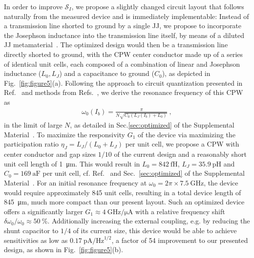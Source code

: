 In order to improve $\mathcal{S}_I$, we propose a slightly changed circuit layout that follows naturally from the measured device and is immediately implementable:
% 
Instead of a transmission line shorted to ground by a single JJ, we propose to incorporate the Josephson inductance into the transmission line itself, by means of a diluted JJ metamaterial~\cite{planatUnderstandingSaturationPower2019}.
% 
The optimized design would then be a transmission line directly shorted to ground, with the CPW center conductor made up of a series of identical unit cells, each composed of a combination of linear and Josephson inductance ($L_0,L_J$) and a capacitance to ground ($C_0$), as depicted in Fig.~\ref{fig:figure5}(a).
% 
Following the approach to circuit quantization presented in Ref.~\cite{gelyQuCATQuantumCircuit2019} and methods from Refs.~\cite{noscheseTridiagonalToeplitzMatrices2013,niggBlackBoxSuperconductingCircuit2012,vool_introductionquantum_2017}, we derive the resonance frequency of this CPW as
% 
\begin{align}
\omega_0(I_b)=\frac{\pi}{N\sqrt{C_0(L_J(I_b)+L_0)}} \ ,
\end{align}
% 
in the limit of large $N$, as detailed in Sec.\ref{sec:optimized} of the Supplemental Material~\cite{SeeSupplementalMaterial}.
% 
To maximize the responsivity $G_1$ of the device via maximizing the participation ratio $\eta_J=L_J/(L_0+L_J)$ per unit cell, we propose a CPW with center conductor and gap sizes $1/10$ of the current design and a reasonably short unit cell length of \SI{1}{\micro\meter}.
% 
This would result in $L_0=\SI{842}{\femto\henry}$, $L_J=\SI{35.9}{\pico\henry}$ and $C_0=\SI{169}{\atto\farad}$ per unit cell, cf. Ref.~\cite{simonsCoplanarWaveguideCircuits2001} and Sec.~\ref{sec:optimized} of the Supplemental Material~\cite{SeeSupplementalMaterial}.
% 
For an initial resonance frequency at $\omega_0=2\pi\times\SI{7.5}{\giga\hertz}$, the device would require approximately 845 unit cells, resulting in a total device length of \SI{845}{\micro\meter}, much more compact than our present layout.
% 
Such an optimized device offers a significantly larger $G_1\approx\SI{4}{\giga\hertz\per\micro\ampere}$ with a relative frequency shift $\delta\omega_0/\omega_0\approx\SI{50}{\percent}$.
% 
Additionally increasing the external coupling, e.g. by reducing the shunt capacitor to $1/4$ of its current size, this device would be able to achieve sensitivities as low as $\SI{0.17}{\pico\ampere\per\hertz\tothe{1/2}}$, a factor of 54 improvement to our presented design, as shown in Fig.~\ref{fig:figure5}(b).
